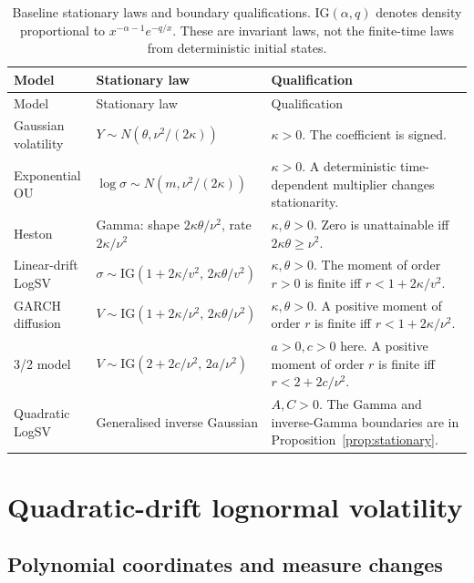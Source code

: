 \documentclass[11pt,a4paper]{article}
\theoremstyle{definition}
\theoremstyle{remark}
\begin{document}
{\small
\setlength{\tabcolsep}{4pt}
\renewcommand{\arraystretch}{1.2}
\begin{longtable}{@{}P{35mm}P{48mm}P{62mm}@{}}
\caption{Baseline stationary laws and boundary qualifications. \(\mathrm{IG}(\alpha,q)\) denotes density proportional to \(x^{-\alpha-1}e^{-q/x}\). These are invariant laws, not the finite-time laws from deterministic initial states.}\label{tab:stationary-comparison}\\
\toprule
Model & Stationary law & Qualification\\
\midrule
\endfirsthead
\toprule Model & Stationary law & Qualification\\ \midrule
\endhead
\bottomrule
\endfoot
Gaussian volatility & \(Y\sim N(\theta,\nu^2/(2\kappa))\) & \(\kappa>0\). The coefficient is signed.\\
Exponential OU & \(\log\sigma\sim N(m,\nu^2/(2\kappa))\) & \(\kappa>0\). A deterministic time-dependent multiplier changes stationarity.\\
Heston & Gamma: shape \(2\kappa\theta/\nu^2\), rate \(2\kappa/\nu^2\) & \(\kappa,\theta>0\). Zero is unattainable iff \(2\kappa\theta\geq\nu^2\).\\
Linear-drift LogSV & \(\sigma\sim\mathrm{IG}(1+2\kappa/v^2,\,2\kappa\theta/v^2)\) & \(\kappa,\theta>0\). The moment of order \(r>0\) is finite iff \(r<1+2\kappa/v^2\).\\
GARCH diffusion & \(V\sim\mathrm{IG}(1+2\kappa/\nu^2,\,2\kappa\theta/\nu^2)\) & \(\kappa,\theta>0\). A positive moment of order \(r\) is finite iff \(r<1+2\kappa/\nu^2\).\\
3/2 model & \(V\sim\mathrm{IG}(2+2c/\nu^2,\,2a/\nu^2)\) & \(a>0,c>0\) here. A positive moment of order \(r\) is finite iff \(r<2+2c/\nu^2\).\\
Quadratic LogSV & Generalised inverse Gaussian & \(A,C>0\). The Gamma and inverse-Gamma boundaries are in Proposition~\ref{prop:stationary}.\\
\end{longtable}
}

\section{Quadratic-drift lognormal volatility}
\label{sec:quadratic}

\subsection{Polynomial coordinates and measure changes}
\end{document}
